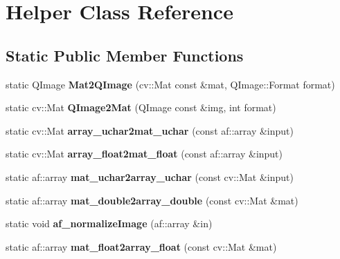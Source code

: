 \hypertarget{class_helper}{}\section{Helper Class Reference}
\label{class_helper}
\subsection*{Static Public Member Functions}
\begin{DoxyCompactItemize}
\item 
\mbox{\label{class_helper_a5e66e2f5409ac58cac63b9836854830a}} 
static Q\+Image {\bfseries Mat2\+Q\+Image} (cv\+::\+Mat const \&mat, Q\+Image\+::\+Format format)
\item 
\mbox{\label{class_helper_a06793307fb64f1b99c0bdfbaee8ef352}} 
static cv\+::\+Mat {\bfseries Q\+Image2\+Mat} (Q\+Image const \&img, int format)
\item 
\mbox{\label{class_helper_a947994cde6826ad714358ec0f83fe4a1}} 
static cv\+::\+Mat {\bfseries array\+\_\+uchar2mat\+\_\+uchar} (const af\+::array \&input)
\item 
\mbox{\label{class_helper_a369ddf1991096ba2d5c18187a5098df8}} 
static cv\+::\+Mat {\bfseries array\+\_\+float2mat\+\_\+float} (const af\+::array \&input)
\item 
\mbox{\label{class_helper_aa9119fc02a6430f29b235412644640af}} 
static af\+::array {\bfseries mat\+\_\+uchar2array\+\_\+uchar} (const cv\+::\+Mat \&input)
\item 
\mbox{\label{class_helper_a256474ba7ccb6c1b7c85ee6273f2d01c}} 
static af\+::array {\bfseries mat\+\_\+double2array\+\_\+double} (const cv\+::\+Mat \&mat)
\item 
\mbox{\label{class_helper_a8a3f7dbf1715f18a0b69296b98d8158a}} 
static void {\bfseries af\+\_\+normalize\+Image} (af\+::array \&in)
\item 
\mbox{\label{class_helper_a66f3e30ead08d59d59887ebdde1c8923}} 
static af\+::array {\bfseries mat\+\_\+float2array\+\_\+float} (const cv\+::\+Mat \&mat)
\item 

\end{DoxyCompactItemize}
